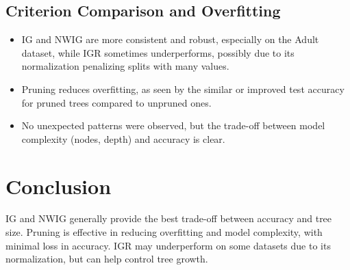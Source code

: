 \documentclass{article}
\begin{document}
\subsection{Criterion Comparison and Overfitting}
\begin{itemize}
    \item IG and NWIG are more consistent and robust, especially on the Adult dataset, while IGR sometimes underperforms, possibly due to its normalization penalizing splits with many values.
    \item Pruning reduces overfitting, as seen by the similar or improved test accuracy for pruned trees compared to unpruned ones.
    \item No unexpected patterns were observed, but the trade-off between model complexity (nodes, depth) and accuracy is clear.
\end{itemize}

\section{Conclusion}
IG and NWIG generally provide the best trade-off between accuracy and tree size. Pruning is effective in reducing overfitting and model complexity, with minimal loss in accuracy. IGR may underperform on some datasets due to its normalization, but can help control tree growth.
\end{document}
